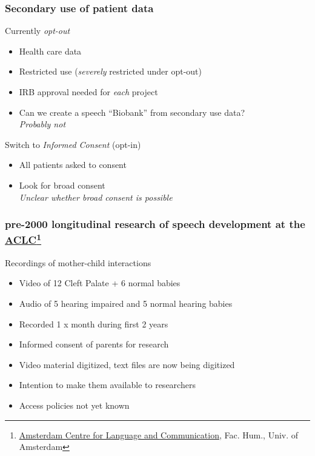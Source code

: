 \documentclass[xcolor=dvipsnames]{beamer}
\begin{document}
\begin{frame}
	\frametitle{Secondary use of patient data}
		
	\begin{block}{Currently {\em opt-out}}
	\begin{itemize}
	\item Health care data
	\item Restricted use ({\em severely} restricted under opt-out) 
	\item IRB approval needed for {\color{Maroon} \em each} project
	\item Can we create a speech ``Biobank'' from secondary use data? \\
	{\em Probably not}
	\end{itemize}
	\end{block}	
	\begin{block}{Switch to {\em Informed Consent} (opt-in)}
	\begin{itemize}
	\item All patients asked to consent
	\item Look for broad consent \\
	{\em Unclear whether broad consent is possible}
	\end{itemize}
	\end{block}	
	
\end{frame}

\begin{frame}
	\frametitle{pre-2000 longitudinal research of speech development at the \href{http://aclc.uva.nl}{ACLC}\footnote[frame]{\scriptsize \href{http://aclc.uva.nl}{\underline{Amsterdam Centre for Language and Communication}}, Fac. Hum., Univ. of Amsterdam}}
		
	\begin{block}{Recordings of mother-child interactions}
	\begin{itemize}
	\item Video of 12 Cleft Palate + 6 normal babies {\scriptsize \cite{koopmans1986early}}
	\item Audio of 5 hearing impaired and 5 normal hearing babies {\scriptsize \cite{clement1994development,vanderstelt2008deaf}}
	\item Recorded 1 x month during first 2 years 
	\item Informed consent of parents for research
	\item Video material digitized, text files are now being digitized
	\item Intention to make them available to researchers
	\item Access policies not yet known
	\end{itemize}
	\end{block}	
	
\end{frame}
\end{document}
